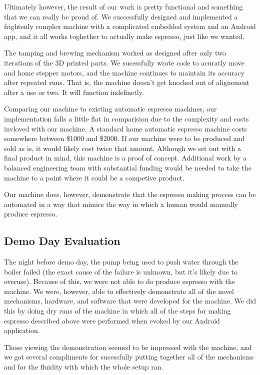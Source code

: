 \documentclass[conference]{IEEEtran}
\begin{document}
Ultimately however, the result of our work is pretty functional and something
that we can really be proud of. We successfully designed and implemented a
frightenly complex machine with a complicated embedded system and an Android app, and it
all works toghether to actually make espresso, just like we wanted.

The tamping and brewing mechanism worked as designed after only two iterations
of the 3D printed parts. We sucessfully wrote code to acuratly move and home
stepper motors, and the machine continues to maintain its accuracy after
repeated runs. That is, the machine doesn't get knocked out of alignement after
a use or two. It will function indefinetly.

Comparing our machine to existing automatic espresso machines, our
implementation falls a little flat in comparision due to the complexity and
costs invloved with our machine. A standard home automatic espresso machine
costs somewhere between \$1000 and \$2000. If our machine were to be produced
and sold as is, it would likely cost twice that amount. Although we set out with a
final product in mind, this machine is a proof of concept. Additional work by a
balanced engineering team with substantial funding would be needed to take the
machine to a point where it could be a competive product. 

Our machine does, however, demonstrate that the espresso making process can be
automated in a way that mimics the way in which a human would manually produce
espresso.
\subsection{Demo Day Evaluation}

The night before demo day, the pump being used to push water through the boiler
failed (the exact cause of the failure is unknown, but it's likely due to
overuse). Because of this, we were not able to do produce espresso with the
machine. We were, however, able to effectively demonstrate all of the novel
mechanisms, hardware, and software that were developed for the machine. We did
this by doing dry runs of the machine in which all of the steps for making
espresso described above were performed when evoked by our Android application.

Those viewing the demonstration seemed to be impressed with the machine, and we
got several compliments for sucessfully putting together all of the mechanisms
and for the fluidity with which the whole setup ran.
\end{document}
